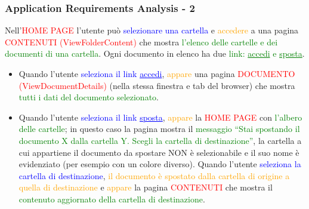 \documentclass[aspectratio=169]{beamer}
\begin{document}
\begin{frame}
    \frametitle{Application Requirements Analysis - 2}
    Nell’\textcolor{Red}{HOME PAGE} l’utente può \textcolor{Blue}{selezionare una cartella} e
    \textcolor{Orange}{accedere} a una pagina \textcolor{Red}{CONTENUTI (ViewFolderContent)} che mostra
    \textcolor{Green}{l’elenco delle cartelle e dei documenti di una cartella}. Ogni documento in elenco ha due
    \textcolor{Green}{link: \underline{accedi} e \underline{sposta}}.\footnotemark{}

    \begin{itemize}
        \item Quando l’utente \textcolor{Blue}{seleziona il link \underline{accedi}}, \textcolor{Orange}{appare} una
              pagina \textcolor{Red}{DOCUMENTO (ViewDocumentDetails)} (nella stessa finestra e tab del browser) che
              mostra \textcolor{Green}{tutti i dati del documento selezionato}.
        \item Quando l’utente \textcolor{Blue}{seleziona il link \underline{sposta}}, \textcolor{Orange}{appare} la
              \textcolor{Red}{HOME PAGE} con \textcolor{Green}{l’albero delle cartelle}; in questo caso la pagina
              mostra il \textcolor{Green}{messaggio “Stai spostando il documento X dalla cartella Y. Scegli la cartella
                  di destinazione”}, la cartella a cui appartiene il documento da spostare NON è selezionabile e il suo
              nome è evidenziato (per esempio con un colore diverso). Quando l’utente \textcolor{Blue}{seleziona la
                  cartella di destinazione}, \textcolor{Orange}{il documento è spostato dalla cartella di origine a
                  quella di destinazione} e \textcolor{Orange}{appare} la pagina \textcolor{Red}{CONTENUTI} che mostra
              il \textcolor{Green}{contenuto aggiornato della cartella di destinazione}.
    \end{itemize}
\end{frame}
\end{document}
